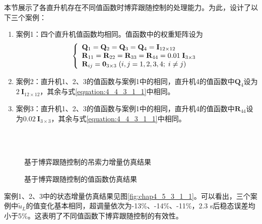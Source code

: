 本节展示了各直升机存在不同值函数时博弈跟随控制的处理能力。为此，设计了以下三个案例：
\begin{enumerate}
  \item 案例1：四个直升机值函数均相同。值函数中的权重矩阵设为
  \begin{equation}
    \left\{ \begin{array}{l}
      {{\bf{Q}}_1} = {{\bf{Q}}_2} = {{\bf{Q}}_3} = {{\bf{Q}}_4} = {{\bf{I}}_{12 \times 12}}\\
      {{\bf{R}}_{11}} = {{\bf{R}}_{22}} = {{\bf{R}}_{33}} = {{\bf{R}}_{44}} = 0.01\;{{\bf{I}}_{3 \times 3}}\;\\
      {{\bf{R}}_{ij}} = {{\bf{0}}_{3 \times 3}}\;(i,j = 1,2,3,4;\;i \ne j)
      \end{array} \right.
    \label{equation:4_4_3_1_1}
  \end{equation}
  \item 案例2：直升机1、2、3的值函数与案例1中的相同，直升机4的值函数中$\mathbf{Q}_{4}$设为$2\ \mathbf{I}_{12\times12}$，其余与式\ref{equation:4_4_3_1_1}中相同。
  \item 案例3：直升机1、2、3的值函数与案例1中的相同，直升机4的值函数中$\mathbf{R}_{44}$设为$0.02\ \mathbf{I}_{3\times3}$，其余与式\ref{equation:4_4_3_1_1}中相同。
\end{enumerate}

\begin{figure}[!htb]
  \quad
  \\
  \quad
  \\
  \quad
  \caption{基于博弈跟随控制的吊索力增量仿真结果}
  \label{fig:chap4_5_3_1_2}
\end{figure}

\begin{figure}[!htb]
  \quad
  \caption{基于博弈跟随控制的值函数仿真结果}
  \label{fig:chap4_5_3_1_3}
\end{figure}

案例1、2、3中的状态增量仿真结果见图\ref{fig:chap4_5_3_1_1}。可以看出，三个案例中$\tilde{u}_L$的值变化基本相同，超调量依次为-13\%、-14\%、-11\%，2.3 s后稳态误差均小于5\%。这表明了不同值函数下博弈跟随控制的有效性。

